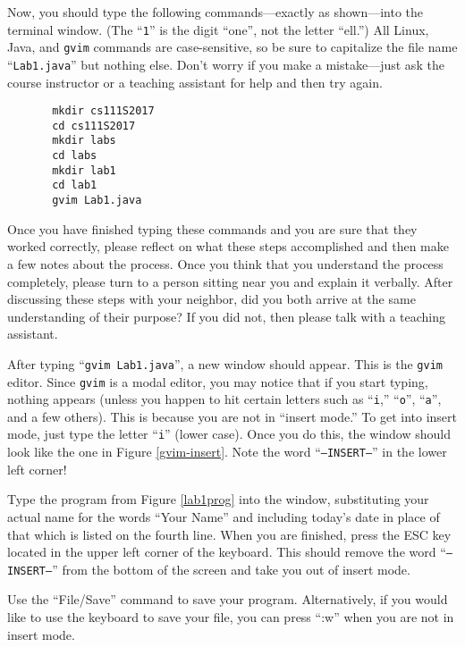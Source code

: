 \documentclass[11pt]{article}
\begin{document}
Now, you should type the following commands---exactly as shown---into the terminal window.  (The ``{\tt 1}'' is the
  digit ``one'', not the letter ``ell.'') All Linux, Java, and {\tt gvim} commands are case-sensitive, so be sure to
capitalize the file name ``{\tt Lab1.java}'' but nothing else.  Don't worry if you make a mistake---just ask the course
instructor or a teaching assistant for help and then try again.

\vspace*{-.1in}
\begin{verbatim}
       mkdir cs111S2017
       cd cs111S2017
       mkdir labs
       cd labs
       mkdir lab1
       cd lab1
       gvim Lab1.java
\end{verbatim}
\vspace*{-.1in}

Once you have finished typing these commands and you are sure that they worked correctly, please reflect on what these
steps accomplished and then make a few notes about the process. Once you think that you understand the process
completely, please turn to a person sitting near you and explain it verbally. After discussing these steps with your
neighbor, did you both arrive at the same understanding of their purpose? If you did not, then please talk with a
teaching assistant.

After typing ``{\tt gvim Lab1.java}'', a new window should appear. This is the {\tt gvim} editor.  Since {\tt gvim} is a
modal editor, you may notice that if you start typing, nothing appears (unless you happen to hit certain letters such as
  ``{\tt i},'' ``{\tt o}'', ``{\tt a}'', and a few others). This is because you are not in ``insert mode.'' To get into
insert mode, just type the letter ``{\tt i}'' (lower case). Once you do this, the window should look like the one in
Figure \ref{gvim-insert}. Note the word ``{\tt --INSERT--}'' in the lower left corner!

Type the program from Figure \ref{lab1prog} into the window, substituting your actual name for the words ``Your Name''
and including today's date in place of that which is listed on the fourth line. When you are finished, press the ESC
key located in the upper left corner of the keyboard. This should remove the word ``{\tt --INSERT--}'' from the bottom
of the screen and take you out of insert mode.

Use the ``File/Save'' command to save your program. Alternatively, if you would like to use the keyboard to save your
file, you can press ``:w'' when you are not in insert mode.
\end{document}
